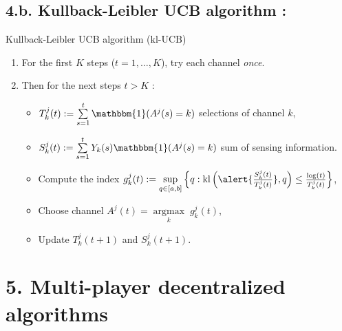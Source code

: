 \documentclass[12pt,english,ignorenonframetext,aspectratio=169,]{beamer}
\providecommand{\tightlist}{%
  \setlength{\itemsep}{0pt}\setlength{\parskip}{0pt}}
\begin{document}
\subsection{\hfill{}4.b. Kullback-Leibler UCB algorithm : \klUCB\hfill{}}

\begin{frame}{Kullback-Leibler UCB algorithm
(\(\mathrm{kl}\)-\(\mathrm{UCB}\))}

\begin{enumerate}
\def\labelenumi{\arabic{enumi}.}
\tightlist
\item
  For the first \(K\) steps (\(t=1,\dots,K\)), try each channel
  \emph{once}.
\item
  Then for the next steps \(t > K\) :

  \begin{itemize}
  \tightlist
  \item
  \(T_k^j(t) := \sum\limits_{s=1}^{t} \mathbbm{1}(A^j(s) = k)\) selections of channel \(k\),
  \item
  \(S_k^j(t) := \sum\limits_{s=1}^{t} Y_{k}(s) \mathbbm{1}(A^j(s) = k)\) sum of sensing information.
  \item
    Compute the index
    \(g_k^j(t) := \sup\limits_{q \in [a, b]} \left\{ q : \mathrm{kl}\left(\alert{\frac{S_k^j(t)}{T_k^j(t)}}, q\right) \leq \frac{\log(t)}{T_k^j(t)} \right\}\),
  \item
    Choose channel \(A^j(t) = \mathop{\arg\max}\limits_{k} \; g_k^j(t)\),
  \item
    Update \(T_k^j(t+1)\) and \(S_k^j(t+1)\).
  \end{itemize}
\end{enumerate}


\end{frame}



\section{\hfill{}5. Multi-player decentralized algorithms\hfill{}}
\end{document}
